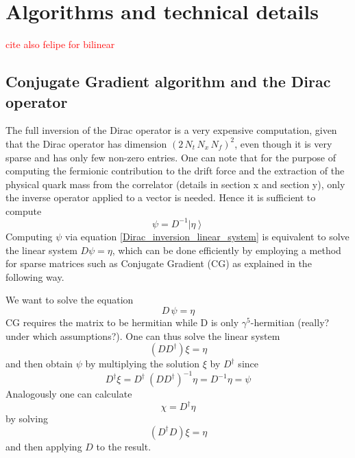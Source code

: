 \chapter{Algorithms and technical details}
\label{chap:AppendixC}
\textcolor{red}{cite also felipe for bilinear}

\section{Conjugate Gradient algorithm and the Dirac operator}
The full inversion of the Dirac operator is a very expensive computation, given that the Dirac operator has dimension $(2 \, N_t \, N_x \, N_f)^2$, even though it is very sparse and has only few non-zero entries. One can note that for the purpose of computing the fermionic contribution to the drift force and the extraction of the physical quark mass from the correlator (details in section x and section y), only the inverse operator applied to a vector is needed. Hence it is sufficient to compute 
\begin{equation}
    \psi = D^{-1} \left| \eta \right\rangle
    \label{Dirac_inversion_linear_system}
\end{equation}
Computing $\psi$ via equation \eqref{Dirac_inversion_linear_system} is equivalent to solve the linear system $D \psi = \eta$, which can be done efficiently by employing a method for sparse matrices such as Conjugate Gradient (CG) as explained in the following way.

We want to solve the equation
\begin{equation*} 
    D \, \psi = \eta
\end{equation*}
CG requires the matrix to be hermitian while D is only $\gamma^5$-hermitian (really? under which assumptions?). One can thus solve the linear system
\begin{equation*}
    \left(D D^{\dagger} \right) \xi = \eta
\end{equation*}
and then obtain $\psi$ by multiplying the solution $\xi$ by $D^{\dagger}$ since 
\begin{equation}
    D^{\dagger} \xi = D^{\dagger} \ \left(D D^{\dagger}\right)^{-1} \eta = D^{-1} \eta = \psi
\end{equation}
Analogously one can calculate
\begin{equation*}
    \chi = D^{\dagger} \eta
\end{equation*}
by solving
\begin{equation*}
    \left(D^{\dagger} D\right) \xi = \eta
\end{equation*}
and then applying $D$ to the result.

